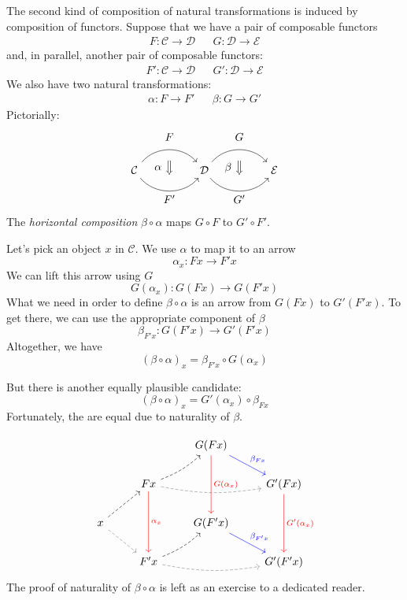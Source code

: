 \documentclass[DaoFP]{subfiles}
\begin{document}
The second kind of composition of natural transformations is induced by composition of functors. Suppose that we have a pair of composable functors
\begin{align*}
 F \colon \mathcal{C} \to \mathcal{D}
&&G \colon \mathcal{D} \to \mathcal{E} 
\end{align*}
and, in parallel, another pair of composable functors:
\begin{align*}
 F' \colon \mathcal{C} \to \mathcal{D}
&& G' \colon \mathcal{D} \to \mathcal{E} 
\end{align*}
We also have two natural transformations:
\begin{align*}
\alpha \colon F \to F'  
&& \beta \colon G \to G' 
\end{align*}
Pictorially:
\[
\begin{tikzcd}[column sep=huge]
\mathcal{C}
  \arrow[bend left=50]{r}[name=U, label=above:$F$]{}
  \arrow[bend right=50]{r}[name=D, label=below:$F'$]{} 
 &
\mathcal{D}
  \arrow[bend left=50]{r}[name=U1, label=above:$G$]{}
  \arrow[bend right=50]{r}[name=D1, label=below:$G'$]{} 
 &
\mathcal{E}
  \arrow[shorten <=10pt,shorten >=10pt,Rightarrow,to path={(U) -- node[label=left:$\alpha$] {} (D)}]{}
  \arrow[shorten <=10pt,shorten >=10pt,Rightarrow,to path={(U1) -- node[label=left:$\beta$] {} (D1)}]{}
\end{tikzcd}
\]
The \emph{horizontal composition} $\beta \circ \alpha$ maps $G \circ F$ to $G' \circ F'$.

Let's pick an object $x$ in $\mathcal{C}$. We use $\alpha$ to map it to an arrow 
\[ \alpha_x \colon F x \to F' x \]
We can lift this arrow using $G$
\[ G (\alpha_x) \colon G (F x) \to G (F' x) \]
What we need in order to define $\beta \circ \alpha$ is an arrow from $G (F x)$ to $G' (F' x)$. To get there, we can use the appropriate component of $\beta$
\[ \beta_{F' x} \colon G (F' x) \to G' (F' x) \]
Altogether, we have
\[ (\beta \circ \alpha)_x = \beta_{F' x} \circ G (\alpha_x) \]

But there is another equally plausible candidate: 
\[ (\beta \circ \alpha)_x = G'(\alpha_x) \circ \beta_{F x}\]
Fortunately, the are equal due to naturality of $\beta$. 

\[
 \begin{tikzcd}
  && G(F x)
  \arrow[dd, red, "G(\alpha_x)"]
  \arrow[dr, blue, "\beta_{F x}"]
  \\
  & F x
  \arrow[rr, bend right=10, dashed, gray]
  \arrow[ur, bend right=10, dashed]
  \arrow[dd, red, "\alpha_x"]
 && G' (F x)
  \arrow[dd, red, "G'(\alpha_x)"]
 \\
 x
 \arrow[ur, dashed]
 \arrow[dr, gray, dashed]
 && G(F' x)
  \arrow[dr, blue, "\beta_{F' x}"]
 \\
 &F' x
  \arrow[rr, bend right=10, dashed, gray]
 \arrow[ur, bend right=10, dashed]
 && G'(F' x)
\end{tikzcd}
\]
The proof of naturality of $\beta \circ \alpha$ is left as an exercise to a dedicated reader.
\end{document}
